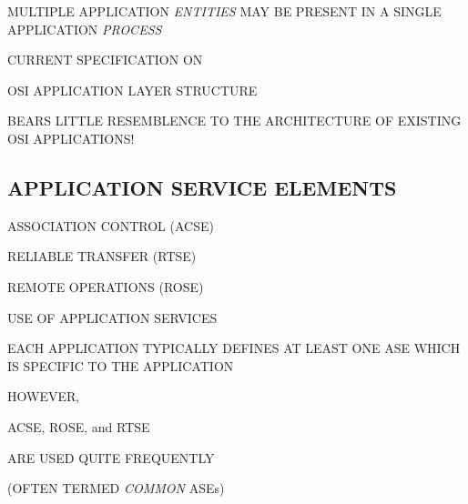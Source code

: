 \begin{bwslide}

\begin{nrtc}
\item	MULTIPLE APPLICATION \emph{ENTITIES} MAY BE PRESENT IN A SINGLE
	APPLICATION \emph{PROCESS}

\item	CURRENT SPECIFICATION ON
    \begin{nrtc}
    \item	OSI APPLICATION LAYER STRUCTURE
    \end{nrtc}
    BEARS LITTLE RESEMBLENCE TO THE ARCHITECTURE OF EXISTING OSI
    APPLICATIONS!
\end{nrtc}
\end{bwslide}


\begin{bwslide}
\part	{APPLICATION SERVICE ELEMENTS}\bf

\begin{nrtc}
\item	ASSOCIATION CONTROL (ACSE)

\item	RELIABLE TRANSFER (RTSE)

\item	REMOTE OPERATIONS (ROSE)

\item	USE OF APPLICATION SERVICES
\end{nrtc}
\end{bwslide}


\begin{bwslide}

\begin{nrtc}
\item	EACH APPLICATION TYPICALLY DEFINES AT LEAST ONE ASE WHICH IS SPECIFIC
	TO THE APPLICATION

\item	HOWEVER,
    \begin{nrtc}
    \item	ACSE, ROSE, and RTSE
    \end{nrtc}
    ARE USED QUITE FREQUENTLY
    \begin{nrtc}
    \item	(OFTEN TERMED \emph{COMMON} ASEs)
    \end{nrtc}
\end{nrtc}
\end{bwslide}


